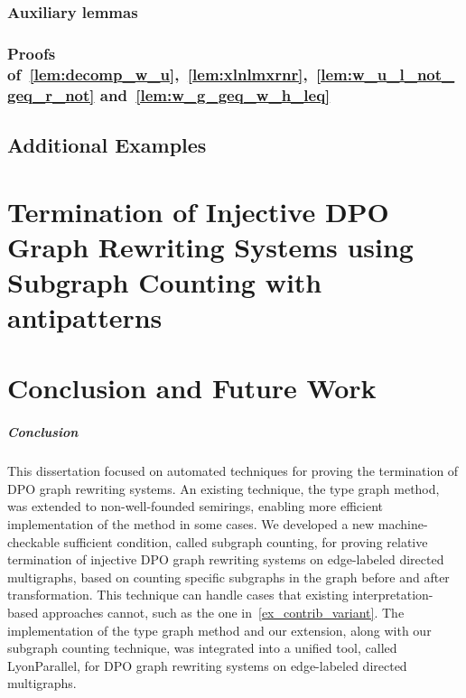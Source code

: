 \documentclass{report}
\begin{document}
\subsection{Auxiliary lemmas}

\subsection{Proofs of~\autoref{lem:decomp_w_u},~\autoref{lem:xlnlmxrnr},~\autoref{lem:w_u_l_not_geq_r_not} and~\autoref{lem:w_g_geq_w_h_leq}}
\label{sec:appendix:a}


\section{Additional Examples}




% 

 



\chapter{Termination of Injective DPO Graph Rewriting
Systems using Subgraph Counting with antipatterns}
 

\chapter{Conclusion and Future Work}
\paragraph{Conclusion}
This dissertation focused on automated techniques for proving the termination of DPO graph rewriting systems.
An existing technique, the type graph method, was extended to non-well-founded semirings, enabling more efficient implementation of the method in some cases.
We developed a new machine-checkable sufficient condition, called subgraph counting, for proving relative termination of injective DPO graph rewriting systems on edge-labeled directed multigraphs, based on counting specific subgraphs in the graph before and after transformation. This technique can handle cases that existing interpretation-based approaches cannot, such as the one in~\autoref{ex_contrib_variant}.
The implementation of the type graph method and our extension, along with our subgraph counting technique, was integrated into a unified tool, called LyonParallel, for DPO graph rewriting systems on edge-labeled directed multigraphs.
 
\end{document}
